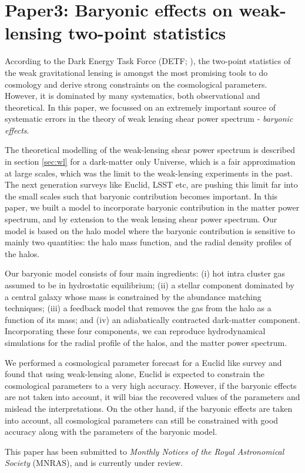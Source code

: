 \chapter{Paper3: Baryonic effects on weak-lensing two-point statistics}\label{paper:baryoniceffects}

According to the Dark Energy Task Force (DETF; \cite{2006astro.ph..9591A}), 
the two-point statistics of the weak gravitational lensing is amongst the most promising
tools to do cosmology and derive strong constraints on the cosmological parameters. 
However, it is dominated by many systematics, both observational and theoretical.
In this paper, we focussed on an extremely important source of systematic errors in the 
theory of weak lensing shear power spectrum - {\it baryonic effects}. 

The theoretical modelling of the weak-lensing shear power spectrum
is described in section \ref{sec:wl} for a dark-matter only Universe, 
which is a fair approximation
at large scales, which was the limit to the weak-lensing experiments in the past. 
The next generation surveys like Euclid, LSST etc, 
are pushing this limit far into the small scales such
that baryonic contribution becomes important. In this paper, we built a model
to incorporate baryonic contribution in the matter power spectrum,
and by extension to the weak lensing shear power spectrum. Our model is based on 
the halo model where the baryonic contribution is sensitive to mainly two quantities: 
the halo mass function, and the radial density profiles of the halos.

Our baryonic model consists of four main ingredients: 
(i) hot intra cluster gas assumed to be in hydrostatic equilibrium;
(ii) a stellar component dominated by a central galaxy 
whose mass is constrained by the abundance matching techniques;
(iii) a feedback model that removes the gas from the halo as a function
of its mass; and 
(iv) an adiabatically contracted dark-matter component. 
Incorporating these four components, 
we can reproduce hydrodynamical simulations 
for the radial profile of the halos, and the matter power spectrum. 

We performed a cosmological parameter forecast for a Euclid like survey and found that using
weak-lensing alone, Euclid is expected to constrain the cosmological parameters to a very
high accuracy. However, if the baryonic effects are not taken into account, it will bias
the recovered values of the parameters and mislead the interpretations. On the other hand,
if the baryonic effects are taken into account, all cosmological
parameters can still be constrained with good accuracy along with the parameters
of the baryonic model.

This paper has been submitted to {\it Monthly Notices of the Royal Astronomical
Society} (MNRAS), and is currently under review.


\clearpage
